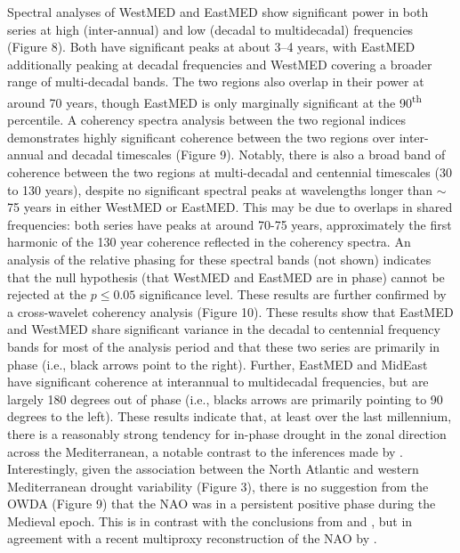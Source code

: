 \documentclass[draft,jgr]{AGUTeX}
\begin{document}
\begin{article}
\indent Spectral analyses of WestMED and EastMED show significant power in both series at high (inter-annual) and low (decadal to multidecadal) frequencies (Figure 8). Both have significant peaks at about 3--4 years, with EastMED additionally peaking at decadal frequencies and WestMED covering a broader range of multi-decadal bands. The two regions also overlap in their power at around 70 years, though EastMED is only marginally significant at the 90\textsuperscript{th} percentile. A coherency spectra analysis between the two regional indices demonstrates highly significant coherence between the two regions over inter-annual and decadal timescales (Figure 9). Notably, there is also a broad band of coherence between the two regions at multi-decadal and centennial timescales (30 to 130 years), despite no significant spectral peaks at wavelengths longer than $\sim$75 years in either WestMED or EastMED. This may be due to overlaps in shared frequencies: both series have peaks at around 70-75 years, approximately the first harmonic of the 130 year coherence reflected in the coherency spectra. An analysis of the relative phasing for these spectral bands (not shown) indicates that the null hypothesis (that WestMED and EastMED are in phase) cannot be rejected at the $p\le0.05$ significance level. These results are further confirmed by a cross-wavelet coherency analysis (Figure 10). These results show that EastMED and WestMED share significant variance in the decadal to centennial frequency bands for most of the analysis period and that these two series are primarily in phase (i.e., black arrows point to the right). Further, EastMED and MidEast have significant coherence at interannual to multidecadal frequencies, but are largely 180 degrees out of phase (i.e., blacks arrows are primarily pointing to 90 degrees to the left). These results indicate that, at least over the last millennium, there is a reasonably strong tendency for in-phase drought in the zonal direction across the Mediterranean, a notable contrast to the inferences made by \citet{Roberts:etal2012}.  Interestingly, given the association between the North Atlantic and western Mediterranean drought variability (Figure 3), there is no suggestion from the OWDA (Figure 9) that the NAO was in a persistent positive phase during the Medieval epoch.  This is in contrast with the conclusions from \citet{Esper:etal2007a} and \citet{Trouet:etal2009}, but in agreement with a recent multiproxy reconstruction of the NAO by \citet{Ortega:etal2015}. 


\end{article}
\end{document}
